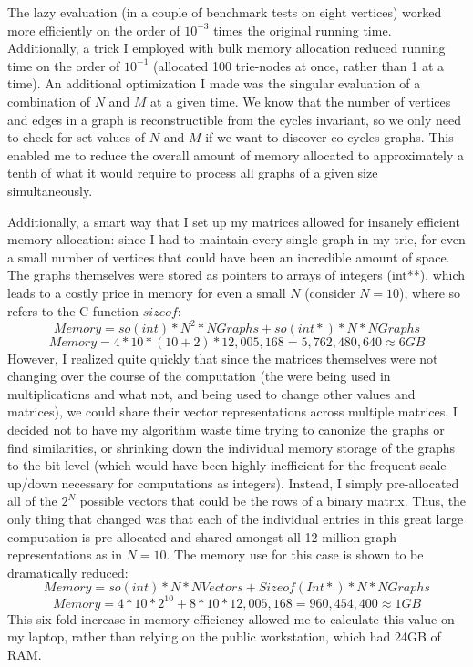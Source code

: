 The lazy evaluation (in a couple of benchmark tests on eight vertices) worked more efficiently on the order of $10^{-3}$ times the original running time.
Additionally, a trick I employed with bulk memory allocation reduced running time on the order of $10^{-1}$ (allocated 100 trie-nodes at once, rather than 1 at a time).
An additional optimization I made was the singular evaluation of a combination of $N$ and $M$ at a given time.
We know that the number of vertices and edges in a graph is reconstructible from the cycles invariant, so we only need to check for set values of $N$ and $M$ if we want to discover co-cycles graphs.
This enabled me to reduce the overall amount of memory allocated to approximately a tenth of what it would require to process all graphs of a given size simultaneously.

Additionally, a smart way that I set up my matrices allowed for insanely efficient memory allocation: since I had to maintain every single graph in my trie, for even a small number of vertices that could have been an incredible amount of space.
The graphs themselves were stored as pointers to arrays of integers (int**), which leads to a costly price in memory for even a small $N$ (consider $N=10$), where so refers to the C function $sizeof$:
$$Memory = so(int) * N^2 * NGraphs + so(int*) * N * NGraphs $$
$$Memory = 4 * 10 * (10+2) * 12,005,168 = 5,762,480,640 \approx 6 GB $$
However, I realized quite quickly that since the matrices themselves were not changing over the course of the computation (the were being used in multiplications and what not, and being used to change other values and matrices), we could share their vector representations across multiple matrices.
I decided not to have my algorithm waste time trying to canonize the graphs or find similarities, or shrinking down the individual memory storage of the graphs to the bit level (which would have been highly inefficient for the frequent scale-up/down necessary for computations as integers).
Instead, I simply pre-allocated all of the $2^N$ possible vectors that could be the rows of a binary matrix.
Thus, the only thing that changed was that each of the individual entries in this great large computation is pre-allocated and shared amongst all 12 million graph representations as in $N = 10$.  The memory use for this case is shown to be dramatically reduced:
$$Memory = so(int) * N * NVectors + Sizeof(Int*) * N * NGraphs$$
$$Memory = 4 * 10 * 2^{10} + 8 * 10 * 12,005,168 = 960,454,400 \approx 1 GB $$
This six fold increase in memory efficiency allowed me to calculate this value on my laptop, rather than relying on the public workstation, which had 24GB of RAM.


